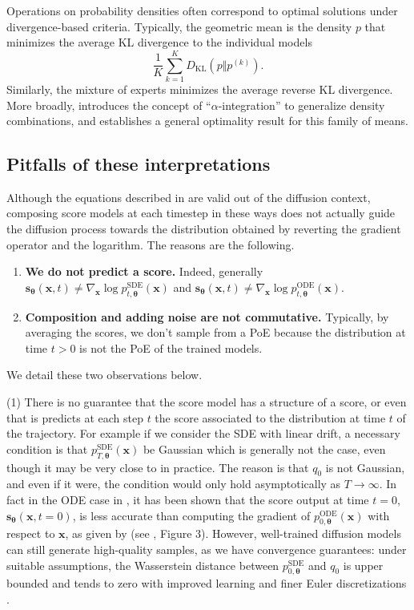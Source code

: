 \documentclass[10pt]{article} %
\newcommand{\engquote}[1]{``#1''}
\newcommand{\SDE}{\text{SDE}}
\newcommand{\ODE}{\text{ODE}}
\def\rvs{{\mathbf{s}}}
\def\rvx{{\mathbf{x}}}
\def\vtheta{{\bm{\theta}}}
\def\vs{{\bm{s}}}
\newcommand{\KL}{D_{\mathrm{KL}}}
\begin{document}
Operations on probability densities often correspond to optimal solutions under divergence-based criteria. Typically, the geometric mean is the density $p$ that minimizes the average KL divergence to the individual models
\begin{equation}
\frac{1}{K} \sum_{k=1}^K \KL(p \Vert p^{(k)}).
\end{equation}
Similarly, the mixture of experts minimizes the average reverse KL divergence. More broadly, \citet{amari2007integration} introduces the concept of \engquote{$\alpha$-integration} to generalize density combinations, and establishes a general optimality result for this family of means.
\subsection{Pitfalls of these interpretations}\label{app: arithmetic mean is not PoE}

Although the equations described in  are valid out of the diffusion context, composing score models at each timestep in these ways does not actually guide the diffusion process towards the distribution obtained by reverting the gradient operator and the logarithm. The reasons are the following.
\begin{enumerate}
\item \textbf{We do not predict a score.} Indeed, generally $\vs_{\vtheta}(\rvx,t) \neq \nabla_{\rvx}\log p_{t,\vtheta}^\SDE(\rvx)$ and $\vs_{\vtheta}(\rvx,t) \neq \nabla_{\rvx}\log p_{t,\vtheta}^\ODE(\rvx)$.
\item \textbf{Composition and adding noise are not commutative.} Typically, by averaging the scores, we don't sample from a PoE because the distribution at time $t>0$ is not the PoE of the trained models.
\end{enumerate}
We detail these two observations below.

(1) There is no guarantee that the score model has a structure of a score, or even that is predicts at each step $t$ the score associated to the distribution at time $t$ of the trajectory. For example if we consider the SDE with linear drift, a necessary condition is that $p^\SDE_{T,\vtheta}(\rvx)$ be Gaussian \citep{lu2022maximum} which is generally not the case, even though it may be very close to in practice. The reason is that $q_0$ is not Gaussian, and even if it were, the condition would only hold asymptotically as $T \to \infty$. In fact in the ODE case in , it has been shown that the score output at time $t=0$, $\rvs_\vtheta(\rvx, t=0)$, is less accurate than computing the gradient of $p_{0,\vtheta}^\ODE(\rvx)$ with respect to $\rvx$, as given by  (see \citealp{feng2023score}, Figure 3). However, well-trained diffusion models can still generate high-quality samples, as we have convergence guarantees: under suitable assumptions, the Wasserstein distance between $p^{\SDE}_{0,\vtheta}$ and $q_0$ is upper bounded and tends to zero with improved learning and finer Euler discretizations \citep{de2022convergence}.
\end{document}
